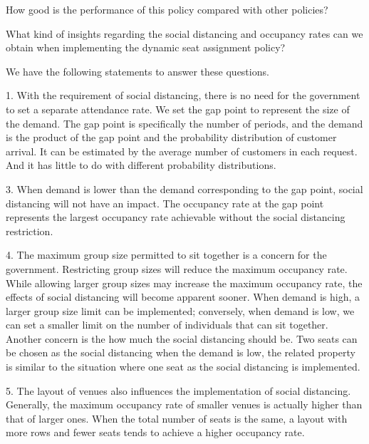 How good is the performance of this policy compared with other policies? 

What kind of insights regarding the social distancing and occupancy rates can we obtain when implementing the dynamic seat assignment policy?

We have the following statements to answer these questions.





1. With the requirement of social distancing, there is no need for the government to set a separate attendance rate. We set the gap point to represent the size of the demand. The gap point is specifically the number of periods, and the demand is the product of the gap point and the probability distribution of customer arrival. It can be estimated by the average number of customers in each request. And it has little to do with different probability distributions.


% 

3. When demand is lower than the demand corresponding to the gap point, social distancing will not have an impact. The occupancy rate at the gap point represents the largest occupancy rate achievable without the social distancing restriction.



4. The maximum group size permitted to sit together is a concern for the government. Restricting group sizes will reduce the maximum occupancy rate. While allowing larger group sizes may increase the maximum occupancy rate, the effects of social distancing will become apparent sooner. When demand is high, a larger group size limit can be implemented; conversely, when demand is low, we can set a smaller limit on the number of individuals that can sit together. Another concern is the how much the social distancing should be. Two seats can be chosen as the social distancing when the demand is low, the related property is similar to the situation where one seat as the social distancing is implemented.



5. The layout of venues also influences the implementation of social distancing. Generally, the maximum occupancy rate of smaller venues is actually higher than that of larger ones. When the total number of seats is the same, a layout with more rows and fewer seats tends to achieve a higher occupancy rate.


